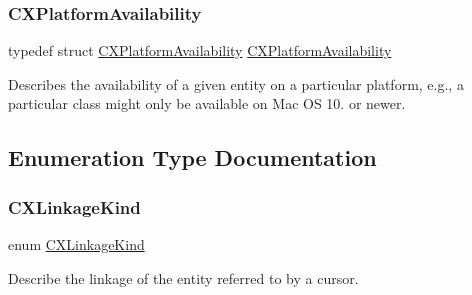 \subsubsection{\texorpdfstring{C\+X\+Platform\+Availability}{CXPlatformAvailability}}
{\footnotesize\ttfamily typedef struct \hyperlink{structCXPlatformAvailability}{C\+X\+Platform\+Availability}  \hyperlink{structCXPlatformAvailability}{C\+X\+Platform\+Availability}}

Describes the availability of a given entity on a particular platform, e.\+g., a particular class might only be available on Mac OS 10. or newer. 

\subsection{Enumeration Type Documentation}
\mbox{\label{group__CINDEX__CURSOR__MANIP_gace57c68a7a11b0967b184a7ef9fbeb9e}} 
\subsubsection{\texorpdfstring{C\+X\+Linkage\+Kind}{CXLinkageKind}}
{\footnotesize\ttfamily enum \hyperlink{group__CINDEX__CURSOR__MANIP_gace57c68a7a11b0967b184a7ef9fbeb9e}{C\+X\+Linkage\+Kind}}



Describe the linkage of the entity referred to by a cursor. 

